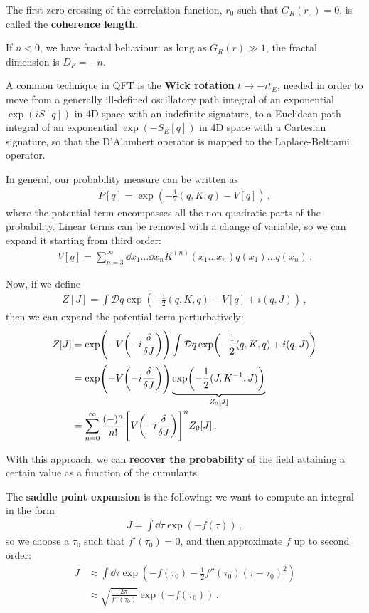 \documentclass[main.tex]{subfiles}
\begin{document}

The first zero-crossing of the correlation function, \(r_0 \) such that \(G_R(r_0 ) = 0\), is called the \textbf{coherence length}. 

If \(n < 0\), we have fractal behaviour: as long as \(G_R(r) \gg 1\), the fractal dimension is \(D_F = -n\). 

A common technique in QFT is the \textbf{Wick rotation} \(t \to -i t_E\), needed in order to move from a generally ill-defined oscillatory path integral of an exponential \(\exp(i S[q])\) in 4D space with an indefinite signature, to a Euclidean path integral of an exponential \(\exp(- S_E[q])\) in 4D space with a Cartesian signature, so that the D'Alambert operator is mapped to the Laplace-Beltrami operator.

In general, our probability measure can be written as 
%
\begin{align}
P[q] = \exp(- \frac{1}{2} (q, K, q) - V[q])
\,,
\end{align}
%
where the potential term encompasses all the non-quadratic parts of the probability. Linear terms can be removed with a change of variable, so we can expand it starting from third order: 
%
\begin{align}
V[q] = \sum _{n=3}^{\infty } \dd{x_1 } \dots \dd{x_n} K^{(n)} (x_1 \dots x_n) q(x_1 )\dots q(x_n)
\,.
\end{align}

Now, if we define 
%
\begin{align}
Z[J] = \int \mathcal{D}q \exp(- \frac{1}{2} (q, K, q) - V[q] + i (q, J) )
\,,
\end{align}
%
then we can expand the potential term perturbatively: 
%
\begin{align}
Z[J] &= \exp(- V \qty(-i \fdv{}{J})) 
\int \mathcal{D}q \exp(- \frac{1}{2} (q, K, q) + i (q, J) )  \\
&= \exp(- V \qty(-i \fdv{}{J}))
\underbrace{\exp(- \frac{1}{2} (J, K^{-1}, J))}_{Z_0 [J]}  \\
&= \sum _{n=0}^{\infty } \frac{(-)^{n}}{n!} \qty[V \qty(-i \fdv{}{J})]^{n} Z_0 [J]
\,.
\end{align}

With this approach, we can \textbf{recover the probability} of the field attaining a certain value as a function of the cumulants.

The \textbf{saddle point expansion} is the following: we want to compute an integral in the form 
%
\begin{align}
J = \int \dd{\tau } \exp(
    - f(\tau )
)
\,,
\end{align}
%
so we choose a \(\tau_0 \) such that \(f' (\tau_0 ) = 0\), and then approximate \(f\) up to second order: 
%
\begin{align}
J &\approx \int \dd{\tau } \exp(
    - f(\tau_0 ) - \frac{1}{2} f''(\tau_0 ) (\tau - \tau_0  )^2
)  \\
&\approx \sqrt{\frac{2 \pi }{f''(\tau_0 )}} \exp(- f(\tau_0 ))
\,.
\end{align}
\end{document}
